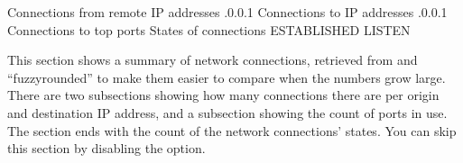 \documentclass[letterpaper,10pt,english]{sphinxmanual}
\begin{document}
\begin{sphinxVerbatim}[commandchars=\\\{\}]
  Connections from remote IP addresses
    .0.0.1           
  Connections to  IP addresses
    .0.0.1           
  Connections to top   ports
                   
                   
  States of connections
    ESTABLISHED         
    LISTEN              
\end{sphinxVerbatim}

This section shows a summary of network connections, retrieved from 
and “fuzzy\sphinxhyphen{}rounded” to make them easier to compare when the numbers grow large.
There are two sub\sphinxhyphen{}sections showing how many connections there are per origin
and destination IP address, and a sub\sphinxhyphen{}section showing the count of ports in
use.  The section ends with the count of the network connections’ states.  You
can skip this section by disabling the {\hyperref[\detokenize{mariadb-system-summary:cmdoption-mariadb-system-summary-summarize-network}]{}} option.
\end{document}
